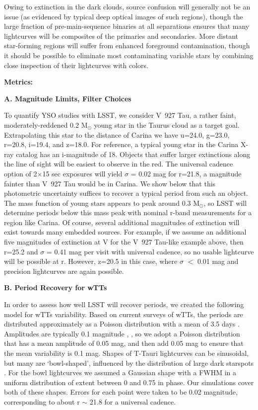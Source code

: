 Owing to extinction in the dark clouds,
source confusion will generally not be an issue (as evidenced by typical
deep optical images of such regions), though the large fraction
of pre-main-sequence binaries at all separations ensures that many
lightcurves will be composites of the primaries and secondaries. 
More distant star-forming regions will suffer from enhanced foreground 
contamination, though it should be possible to eliminate most contaminating
variable stars by combining close inspection of their lightcurves with
colors.

\bf{Metrics:}

\bf{A. Magnitude Limits, Filter Choices}

To quantify YSO studies with LSST, we consider V~927 Tau, 
a rather faint, moderately-reddened 0.2 M$_\odot$ young star in the Taurus cloud
as a target goal. Extrapolating this star
to the distance of Carina we have u=24.0, g=23.0, r=20.8, i=19.4, and z=18.0. For reference,
a typical young star in the Carina X-ray catalog has an i-magnitude of 18.
Objects that suffer larger extinctions along the line of sight will
be easiest to observe in the red. The universal cadence option of 2$\times$15 sec
exposures will yield $\sigma$ = 0.02 mag for r=21.8, a magnitude fainter than
V~927 Tau would be in Carina. We show below that this photometric uncertainty 
suffices to recover a typical period from such an object. The mass function
of young stars appears to peak around 0.3 M$_\odot$, so LSST will 
determine periods below this mass peak with nominal r-band measurements
for a region like Carina. Of course, several additional magnitudes of extinction will
exist towards many embedded sources. For example, if we assume an additional five magnitudes
of extinction at V for the V~927 Tau-like example above,
then r=25.2 and $\sigma$ = 0.41 mag per visit with universal cadence,
so no usable lightcurve will be possible at r. 
However, z=20.5 in this case, where $\sigma$ $<$ 0.01 mag and precision
lightcurves are again possible. 

\bf{B. Period Recovery for wTTs}

In order to assess how well LSST will recover periods, we created the following
model for wTTs variability.  Based on current surveys of wTTs, the periods are
distributed approximately as a Poisson distribution with a mean of 3.5 days
\citep[Affer et al. (2013)]{Affer13}. 
Amplitudes are typically 0.1 magnitude \citep[(Grankin et al. 2008)]{ROTOR},
, so we adopt a Poisson distribution 
that has a mean amplitude of 0.05 mag, and then add 0.05 mag to ensure that
the mean variability is 0.1 mag. Shapes of T-Tauri lightcurves can be sinusoidal,
but many are `bowl-shaped', influenced by the distribution of large dark starspots
\citep[(Alencar et al. 2010)]{CoRoT}.
For the bowl lightcurves we assumed a Gaussian shape with a FWHM in a uniform
distribution of extent between 0 and 0.75 in phase.
Our simulations cover both of these shapes.
Errors for each point were taken to be 0.02 magnitude, corresponding to
about r $\sim$ 21.8 for a universal cadence. 

